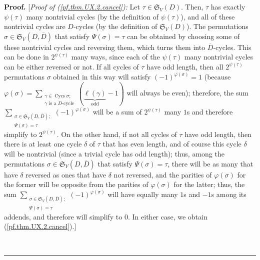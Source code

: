 \documentclass[numbers=enddot,12pt,final,onecolumn,notitlepage]{scrartcl}%
\numberwithin{exer}{section}
\theoremstyle{definition}
\newenvironment{proof}[1][Proof]{\noindent\textbf{#1.} }{\ \rule{0.5em}{0.5em}}
\let\sumnonlimits\sum
\renewcommand{\sum}{\sumnonlimits\limits}
\begin{document}
\begin{proof}
[\textit{Proof of (\ref{pf.thm.UX.2.cancel}):} Let $\tau\in\mathfrak{S}%
_{V}\left(  D\right)  $. Then, $\tau$ has exactly $\psi\left(  \tau\right)  $
many nontrivial cycles (by the definition of $\psi\left(  \tau\right)  $), and
all of these nontrivial cycles are $D$-cycles (by the definition of
$\mathfrak{S}_{V}\left(  D\right)  $). The permutations $\sigma\in
\mathfrak{S}_{V}\left(  D,\overline{D}\right)  $ that satisfy $\Psi\left(
\sigma\right)  =\tau$ can be obtained by choosing some of these nontrivial
cycles and reversing them, which turns them into $\overline{D}$-cycles. This
can be done in $2^{\psi\left(  \tau\right)  }$ many ways, since each of the
$\psi\left(  \tau\right)  $ many nontrivial cycles can be either reversed or
not. If all cycles of $\tau$ have odd length, then all $2^{\psi\left(
\tau\right)  }$ permutations $\sigma$ obtained in this way will satisfy
$\left(  -1\right)  ^{\varphi\left(  \sigma\right)  }=1$ (because
$\varphi\left(  \sigma\right)  =\sum_{\substack{\gamma\in\operatorname*{Cycs}%
\sigma;\\\gamma\text{ is a }D\text{-cycle}}}\left(  \underbrace{\ell\left(
\gamma\right)  }_{\text{odd}}-1\right)  $ will always be even); therefore, the
sum $\sum_{\substack{\sigma\in\mathfrak{S}_{V}\left(  D,\overline{D}\right)
;\\\Psi\left(  \sigma\right)  =\tau}}\left(  -1\right)  ^{\varphi\left(
\sigma\right)  }$ will be a sum of $2^{\psi\left(  \tau\right)  }$ many $1$s
and therefore simplify to $2^{\psi\left(  \tau\right)  }$. On the other hand,
if not all cycles of $\tau$ have odd length, then there is at least one cycle
$\delta$ of $\tau$ that has even length, and of course this cycle $\delta$
will be nontrivial (since a trivial cycle has odd length); thus, among the
permutations $\sigma\in\mathfrak{S}_{V}\left(  D,\overline{D}\right)  $ that
satisfy $\Psi\left(  \sigma\right)  =\tau$, there will be as many that have
$\delta$ reversed as ones that have $\delta$ not reversed, and the parities of
$\varphi\left(  \sigma\right)  $ for the former will be opposite from the
parities of $\varphi\left(  \sigma\right)  $ for the latter; thus, the sum
$\sum_{\substack{\sigma\in\mathfrak{S}_{V}\left(  D,\overline{D}\right)
;\\\Psi\left(  \sigma\right)  =\tau}}\left(  -1\right)  ^{\varphi\left(
\sigma\right)  }$ will have equally many $1$s and $-1$s among its addends, and
therefore will simplify to $0$. In either case, we obtain
(\ref{pf.thm.UX.2.cancel}).] \medskip


\end{proof}
\end{document}
